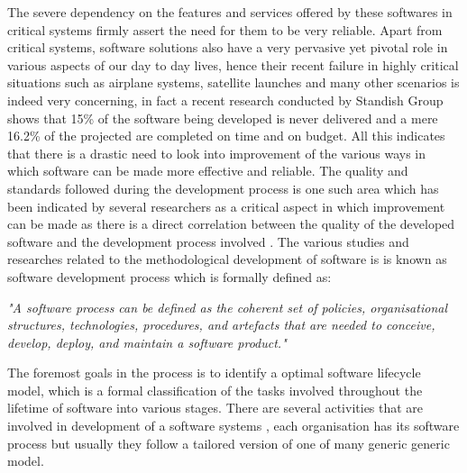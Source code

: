 \documentclass[12pt]{article}
\begin{document}
The severe dependency on the features and services offered by these softwares in critical systems firmly assert the need for them to be very reliable. Apart from critical systems, software solutions also have a very pervasive yet pivotal role in various aspects of our day to day lives, hence their recent failure in highly critical situations such as airplane systems, satellite launches \cite{dowson1997ariane} and many other scenarios is indeed very concerning, in fact a recent research conducted by Standish Group \cite{clancy1995standish} shows that 15\% of the software being developed is never delivered and a mere 16.2\% of the projected are completed on time and on budget. All this indicates that there is a drastic need to look into improvement of the various ways in which software can be made more effective and reliable. The quality and standards followed during the development process is one such area which has been indicated by several researchers as a critical aspect in which improvement can be made as there is a direct correlation between the quality of the developed software and the development process involved \cite{fuggetta2000software}. The various studies and researches related to the methodological development of software is is known as software development process \cite{fuggetta2000software} which is formally defined as:


\textit{"A software process can be defined as the coherent set of policies, organisational structures, technologies, procedures, and artefacts that are needed to conceive, develop, deploy, and maintain a software product."}



The foremost goals in the process is to identify a optimal software lifecycle model, which is a formal classification of the tasks involved throughout the lifetime of software into various stages. There are several activities that are involved in development of a software systems \cite{sommerville1996software}, each organisation has its software process but usually they follow a tailored version of one of many generic generic model. 
\end{document}
